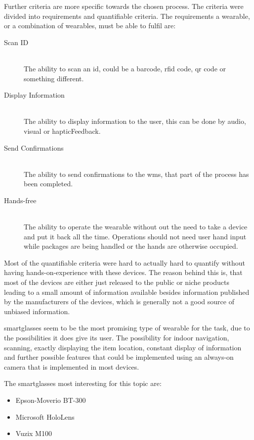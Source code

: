 Further criteria are more specific towards the chosen process. The criteria were divided into requirements and quantifiable criteria. The requirements a wearable, or a combination of wearables, must be able to fulfil are:
\begin{description}
	\item[Scan ID] \hfill \\
		The ability to scan an \gls{id}, could be a barcode, \gls{rfid} code, \gls{qr} code or something different.
	\item[Display Information] \hfill \\
		The ability to display information to the user, this can be done by audio, visual or \gls{hapticFeedback}. 
	\item[Send Confirmations] \hfill \\
		The ability to send confirmations to the \gls{wms}, that part of the process has been completed.
	\item[Hands-free] \hfill \\
		The ability to operate the wearable without out the need to take a device and put it back all the time. Operations should not need user hand input while packages are being handled or the hands are otherwise occupied.
\end{description}

Most of the quantifiable criteria were hard to actually hard to quantify without having hands-on-experience with these devices. The reason behind this is, that most of the devices are either just released to the public or niche products leading to a small amount of information available besides information published by the manufacturers of the devices, which is generally not a good source of unbiased information.

\Gls{smartglasses} seem to be the most promising type of wearable for the task, due to the possibilities it does give its user. The possibility for indoor navigation, scanning, exactly displaying the item location, constant display of information and further possible features that could be implemented using an always-on camera that is implemented in most devices. \cite{phdthesis:pickByVision}

The \gls{smartglasses} most interesting for this topic are:

\begin{itemize}
	\item Epson-Moverio BT-300
	\item Microsoft HoloLens
	\item Vuzix M100
\end{itemize}

